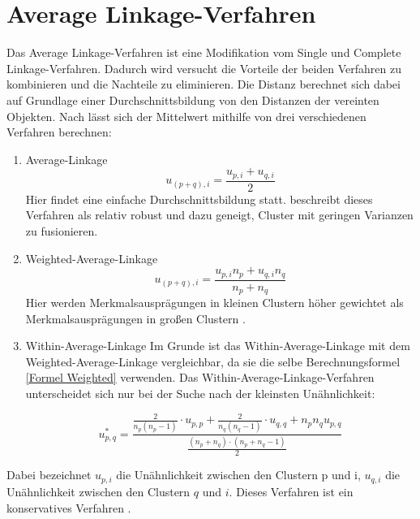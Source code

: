 \section{Average Linkage-Verfahren}
Das Average Linkage-Verfahren ist eine Modifikation vom Single und Complete Linkage-Verfahren. Dadurch wird versucht die Vorteile der beiden Verfahren zu kombinieren und die Nachteile zu eliminieren. Die Distanz berechnet sich dabei auf Grundlage einer Durchschnittsbildung von den Distanzen der vereinten Objekten.
Nach \citet[S. 264]{Bacher.2010} lässt sich der Mittelwert mithilfe von drei verschiedenen Verfahren berechnen:
\begin{enumerate}
	\item Average-Linkage
	\begin{equation}
		u_{(p+q),i} = \frac{u_{p,i} + u_{q,i}}{2}
	\end{equation}
	Hier findet eine einfache Durchschnittsbildung statt. \citet[S. 79]{Everitt.2011} beschreibt dieses Verfahren als relativ robust und dazu geneigt, Cluster mit geringen Varianzen zu fusionieren.
	\item Weighted-Average-Linkage
	\begin{equation}
		u_{(p+q),i} = \frac{u_{p,i}n_{p} + u_{q,i}n_{q}}{n_{p} + n_{q}}
		\label{Formel Weighted}
	\end{equation}
	Hier werden Merkmalsausprägungen in kleinen Clustern höher gewichtet als Merkmalsausprägungen in großen Clustern \citep[Vgl.][S. 79]{Everitt.2011}.
	\item Within-Average-Linkage 
	Im Grunde ist das Within-Average-Linkage mit dem Weighted-Average-Linkage vergleichbar, da sie die selbe Berechnungsformel \ref{Formel Weighted} verwenden. Das Within-Average-Linkage-Verfahren unterscheidet sich nur bei der Suche nach der kleinsten Unähnlichkeit: 
	
	\begin{equation}
	u_{p,q}^* = \frac{
					\frac{2}{n_p(n_p-1)}
					\cdot u_{p,p}+
					\frac{2}{n_q(n_q-1)}
					\cdot u_{q,q}+n_pn_qu_{p,q}
				}
				{
				\frac{(n_p+n_q)\cdot(n_p+n_q-1)}{2}
				}
	\end{equation}

\end{enumerate}
Dabei bezeichnet $u_{p,i}$ die Unähnlichkeit zwischen den Clustern p und i, $u_{q,i}$ die Unähnlichkeit zwischen den Clustern $q$ und $i$.
Dieses Verfahren ist ein konservatives Verfahren \citep[Vgl.][S. 264-266]{Bacher.2010}. 

